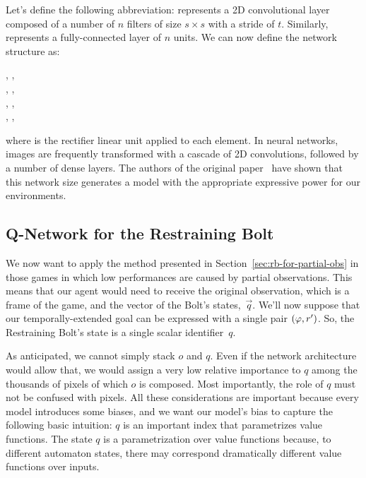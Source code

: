 Let's define the following abbreviation:  represents
a 2D convolutional layer composed of a number of $n$ filters of size $s \times
s$ with a stride of $t$. Similarly,  represents a
fully-connected layer of $n$ units. We can now define the network structure
as:
\begin{center}
	, \relu{}, \\
	, \relu{}, \\
	, \relu{}, \\
	, \relu{}, \\
\end{center}
where \relu{} is the rectifier linear unit applied to each element. In neural
networks, images are frequently transformed with a cascade of 2D convolutions,
followed by a number of dense layers. The authors of the original
paper~\cite{bib:atari-deepq-nature} have shown that this network size
generates a model with the appropriate expressive power for our environments.


\subsection{Q-Network for the Restraining Bolt}

\label{sec:model-atari-rb}

We now want to apply the method presented in
Section~\ref{sec:rb-for-partial-obs} in those games in which low performances
are caused by partial observations. This means that our agent would need to
receive the original observation, which is a frame of the game, and the
vector of the Bolt's states,~$\vec{q}$. We'll now suppose that our
temporally-extended goal can be expressed with a single pair ${(\varphi,
r')}$. So, the Restraining Bolt's state is a single scalar identifier~$q$.

As anticipated, we cannot simply stack $o$ and $q$. Even if the network
architecture would allow that, we would assign a very low relative importance
to $q$ among the thousands of pixels of which $o$ is composed. Most
importantly, the role of $q$ must not be confused with pixels. All these
considerations are important because every model introduces some biases, and
we want our model's bias to capture the following basic intuition: $q$ is an
important index that parametrizes value functions. The state $q$ is a
parametrization over value functions because, to different automaton states,
there may correspond dramatically different value functions over inputs.

